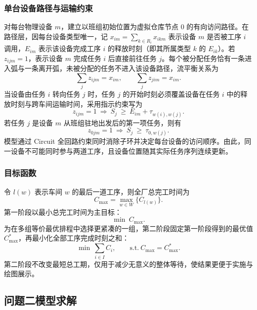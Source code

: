 \documentclass[12pt,a4paper]{article}
\begin{document}
\subsubsection{单台设备路径与运输约束}

对每台物理设备 $m$，建立以班组初始位置为虚拟仓库节点 0 的有向访问路径。在路径层，因每台设备类型唯一，记 $x_{im}=\sum_{k\in R_i}x_{ikm}$ 表示设备 $m$ 是否被工序 $i$ 调用，$E_{im}$ 表示该设备完成工序 $i$ 的释放时刻（即其所属类型 $k$ 的 $E_{ik}$）。若 $z_{ijm}=1$，表示设备 $m$ 完成任务 $i$ 后直接前往任务 $j$。每个被分配任务恰有一条进入弧与一条离开弧，未被分配的任务不进入该设备路径，流平衡关系为
\begin{equation}
\sum_j z_{ijm}=x_{im},\qquad \sum_j z_{jim}=x_{im}.
\end{equation}
当设备由任务 $i$ 转向任务 $j$ 时，任务 $j$ 的开始时刻必须覆盖设备在任务 $i$ 中的释放时刻与跨车间运输时间，采用指示约束写为
\begin{equation}
z_{ijm}=1\ \Rightarrow\ S_j\ \ge\ E_{im}+\tau_{w(i),w(j)} .
\end{equation}
若任务 $j$ 是设备 $m$ 从班组驻地出发后的第一项任务，则有
\begin{equation}
z_{0jm}=1\ \Rightarrow\ S_j\ \ge\ \tau_{0,w(j)} .
\end{equation}
模型通过 Circuit 全回路约束同时消除子环并决定每台设备的访问顺序。由此，同一设备不可能同时参与两道工序，且设备位置随其实际任务序列连续更新。

\subsubsection{目标函数}

令 $l(w)$ 表示车间 $w$ 的最后一道工序，则全厂总完工时间为
\begin{equation}
C_{\max}=\max_{w\in W}\{C_{l(w)}\}.
\end{equation}
第一阶段以最小总完工时间为主目标：
\begin{equation}
\min\ C_{\max}.
\end{equation}
为在多组等价最优排程中选择更紧凑的一组，第二阶段固定第一阶段得到的最优值 $C_{\max}^{*}$，再最小化全部工序完成时刻之和：
\begin{equation}
\min\ \sum_{i\in I} C_i,\qquad \text{s.t.}\ C_{\max}=C_{\max}^{*}.
\end{equation}
第二阶段不改变最短总工期，仅用于减少无意义的整体等待，使结果更便于实施与绘图展示。

\subsection{问题二模型求解}
\end{document}
